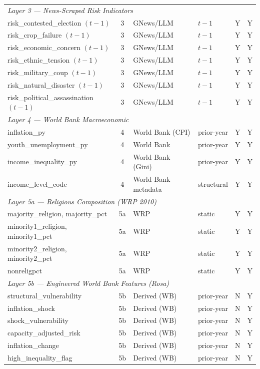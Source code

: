 \documentclass[12pt,a4paper]{article}
\begin{document}
\begin{longtable}{p{6.2cm} c p{3cm} l c c}
\multicolumn{6}{l}{\textit{Layer 3 — News-Scraped Risk Indicators}} \\
risk\_contested\_election $(t-1)$ & 3 & GNews/LLM & $t-1$ & Y & Y \\
risk\_crop\_failure $(t-1)$ & 3 & GNews/LLM & $t-1$ & Y & Y \\
risk\_economic\_concern $(t-1)$ & 3 & GNews/LLM & $t-1$ & Y & Y \\
risk\_ethnic\_tension $(t-1)$ & 3 & GNews/LLM & $t-1$ & Y & Y \\
risk\_military\_coup $(t-1)$ & 3 & GNews/LLM & $t-1$ & Y & Y \\
risk\_natural\_disaster $(t-1)$ & 3 & GNews/LLM & $t-1$ & Y & Y \\
risk\_political\_assassination $(t-1)$ & 3 & GNews/LLM & $t-1$ & Y & Y \\
\multicolumn{6}{l}{\textit{Layer 4 — World Bank Macroeconomic}} \\
inflation\_py & 4 & World Bank (CPI) & prior-year & Y & Y \\
youth\_unemployment\_py & 4 & World Bank & prior-year & Y & Y \\
income\_inequality\_py & 4 & World Bank (Gini) & prior-year & Y & Y \\
income\_level\_code & 4 & World Bank metadata & structural & Y & Y \\
\multicolumn{6}{l}{\textit{Layer 5a — Religious Composition (WRP 2010)}} \\
majority\_religion, majority\_pct & 5a & WRP & static & Y & Y \\
minority1\_religion, minority1\_pct & 5a & WRP & static & Y & Y \\
minority2\_religion, minority2\_pct & 5a & WRP & static & Y & Y \\
nonreligpct & 5a & WRP & static & Y & Y \\
\multicolumn{6}{l}{\textit{Layer 5b — Engineered World Bank Features (Rosa)}} \\
structural\_vulnerability & 5b & Derived (WB) & prior-year & N & Y \\
inflation\_shock & 5b & Derived (WB) & prior-year & N & Y \\
shock\_vulnerability & 5b & Derived (WB) & prior-year & N & Y \\
capacity\_adjusted\_risk & 5b & Derived (WB) & prior-year & N & Y \\
inflation\_change & 5b & Derived (WB) & prior-year & N & Y \\
high\_inequality\_flag & 5b & Derived (WB) & prior-year & N & Y \\

\end{longtable}
\end{document}
